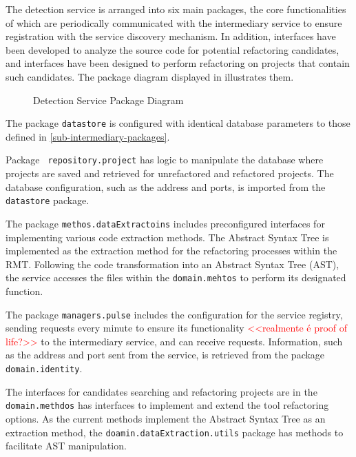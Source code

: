 The detection service is arranged into six main packages, the core functionalities of which are periodically communicated with the intermediary service to ensure registration with the service discovery mechanism. In addition, interfaces have been developed to analyze the source code for potential refactoring candidates, and interfaces have been designed to perform refactoring on projects that contain such candidates. The package diagram displayed in  illustrates them.
\begin{figure}[ht!]
\SetCaptionWidth{\textwidth}
\caption{Detection Service Package Diagram}
\label{fig-package-detection}
\fontsize{7.5}{9.5}\selectfont

\end{figure}
\FloatBarrier

The package \texttt{datastore} is configured with identical database parameters to those defined in \cref{sub-intermediary-packages}.

Package \texttt{ repository.project} has logic to manipulate the database where projects are saved and retrieved for unrefactored and refactored projects. The database configuration, such as the address and ports, is imported from the \texttt{datastore} package.

The package \texttt{methos.dataExtractoins} includes preconfigured interfaces for implementing various code extraction methods. The Abstract Syntax Tree is implemented as the extraction method for the refactoring processes within the RMT. Following the code transformation into an Abstract Syntax Tree (AST), the service accesses the files within the \texttt{domain.mehtos} to perform its designated function.

The package \texttt{managers.pulse} includes the configuration for the service registry, sending requests every minute to ensure its functionality \textcolor{red}{<<realmente é proof of life?>>} to the intermediary service, and can receive requests. Information, such as the address and port sent from the service, is retrieved from the package \texttt{domain.identity}.

The interfaces for candidates searching and refactoring projects are in the \texttt{domain.methdos} has interfaces to implement and extend the tool refactoring options. As the current methods implement the Abstract Syntax Tree as an extraction method, the \texttt{doamin.dataExtraction.utils} package has methods to facilitate AST manipulation.

